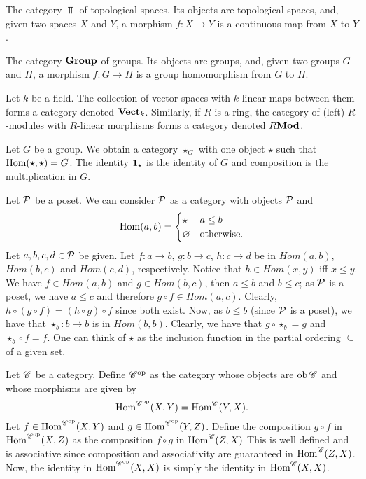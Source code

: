 \begin{example}
  The category $\Top$ of topological spaces.
  Its objects are topological spaces, and, given two spaces $X$ and $Y$, a morphism $f : X \to Y$ is a continuous map from $X$ to $Y$.
\end{example}

\begin{example}
  The category $\mathbf{Group}$ of groups.
  Its objects are groups, and, given two groups $G$ and $H$, a morphism $f : G \to H$ is a group homomorphism from $G$ to $H$.
\end{example}

\begin{example}
  Let $k$ be a field.
  The collection of vector spaces with $k$-linear maps between them forms a category denoted $\mathbf{Vect}_{k}$.
  Similarly, if $R$ is a ring, the category of (left) $R$-modules with $R$-linear morphisms forms a category denoted $R\mathbf{Mod}$.
\end{example}

\begin{example}
  Let $G$ be a group.
  We obtain a category $\star_{G}$ with one object $\star$ such that $\operatorname{Hom}(\star,\star) = G$.
  The identity $\mathbf{1}_{\star}$ is the identity of $G$ and composition is the multiplication in $G$.
\end{example}

\begin{example}
  Let $\mathcal{P}$ be a poset.
  We can consider $\mathcal{P}$ as a category with objects $\mathcal{P}$ and
  \[ \operatorname{Hom}(a,b) = \begin{cases}
      {\star} & a \le b \\
      \varnothing & \text{otherwise}.
    \end{cases}\]
  Let $a,b,c,d\in \mathcal{P}$ be given. 
  Let $f:a\to b$, $g:b\to c$, $h:c\to d$ be in $Hom(a,b)$, $Hom(b,c)$ and $Hom(c,d)$, respectively.
  Notice that $h\in Hom(x,y)$ iff $x\le y$. 
  We have $f\in Hom(a,b)$ and $g\in Hom(b,c)$, then $a\le b$ and $b\le c$; as $\mathcal{P}$ is a poset, we have $a\le c$ and therefore $g\circ f\in Hom(a,c)$. 
  Clearly, $h\circ(g\circ f)=(h\circ g)\circ f$ since both exist.
  Now, as $b\le b$ (since $\mathcal{P}$ is a poset), we have that $\star_b:b\to b$ is in $Hom(b,b)$. Clearly, we have that $g\circ \star_b=g$ and $\star_b\circ f=f$.
  One can think of $\star$ as the inclusion function in the partial ordering $\subseteq$ of a given set.
\end{example}

\begin{example}
  Let $\mathscr{C}$ be a category.
  Define $\mathscr{C}^{\mathrm{op}}$ as the category whose objects are $\operatorname{ob} \mathscr{C}$ and whose morphisms are given by
  \[ \operatorname{Hom}^{\mathscr{C}^{\mathrm{op}}}(X,Y) = \operatorname{Hom}^{\mathscr{C}}(Y,X). \]
  Let $f\in \operatorname{Hom}^{\mathscr{C}^{\mathrm{op}}}(X,Y)$ and $g\in \operatorname{Hom}^{\mathscr{C}^{\mathrm{op}}}(Y,Z)$. 
  Define the composition $g\circ f$ in $\operatorname{Hom}^{\mathscr{C}^{\mathrm{op}}}(X,Z)$ as the composition $f\circ g$ in $\operatorname{Hom}^{\mathscr{C}}(Z,X)$
  This is well defined and is associative since composition and associativity are guaranteed in $\operatorname{Hom}^{\mathscr{C}}(Z,X)$.
  Now, the identity in $\operatorname{Hom}^{\mathscr{C}^{\mathrm{op}}}(X,X)$ is simply the identity in $\operatorname{Hom}^{\mathscr{C}}(X,X)$.
\end{example}

